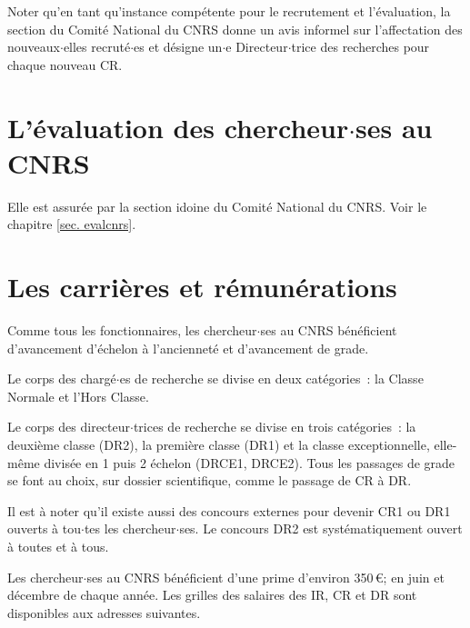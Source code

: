 Noter qu'en tant qu'instance comp\'etente pour le recrutement et l'\'evaluation,
la section du Comit\'e National du CNRS donne un avis informel sur l'affectation des nouveaux$\cdot$elles
recrut\'e$\cdot$es et d\' esigne un$\cdot$e Directeur$\cdot$trice des recherches pour chaque nouveau CR.


\section{L'\'evaluation des chercheur$\cdot$ses au CNRS}

Elle est assur\'ee par la section idoine du Comit\'e National du CNRS. Voir le chapitre \ref{sec. evalcnrs}.



\section{Les carri\`eres et r\'emun\'erations}

Comme tous les fonctionnaires, les chercheur$\cdot$ses au CNRS
b\'en\'eficient d'avancement d'\'echelon \`a
l'anciennet\'e et d'avancement de grade.

Le corps des charg\'e$\cdot$es de recherche se divise en deux cat\'egories~: la Classe Normale et l'Hors Classe.

Le corps des directeur$\cdot$trices de recherche se divise en trois
cat\'egories~: la deuxi\`eme classe (DR2), la premi\`ere classe
(DR1) et la classe exceptionnelle, elle-m\^eme divis\'ee en
1\ier{} puis 2\ieme{} \'{e}chelon (DRCE1,
DRCE2).
Tous les passages de grade se font au choix, sur dossier
scientifique, comme le passage de CR \`a DR.

Il est \`a noter qu'il existe aussi des concours externes pour devenir CR1 ou DR1 ouverts \`a
tou$\cdot$tes les chercheur$\cdot$ses. Le concours DR2 est syst\'ematiquement ouvert \`a toutes et à tous. 

Les chercheur$\cdot$ses au CNRS b\'{e}n\'{e}ficient d'une prime d'environ
350\,\euro{}; en juin et d\'{e}cembre de chaque ann\'ee. Les grilles
des salaires des IR, CR et DR sont disponibles aux adresses suivantes. 


